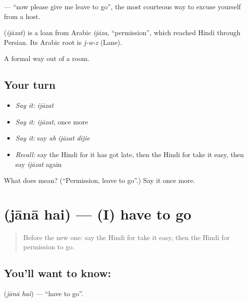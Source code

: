 \textbf{  } — \textquotedblleft{}now please give me leave to go\textquotedblright{}, the most courteous way to excuse yourself from a host.

\begin{cousinweb}
\textbf{} (\emph{ijāzat}) is a loan from Arabic \emph{ijāza}, \textquotedblleft{}permission\textquotedblright{}, which reached Hindi through Persian. Its Arabic root is \emph{j-w-z} (Lane).
\end{cousinweb}

\begin{grammarlens}[title={What you've built}]
A formal way out of a room.
\end{grammarlens}

\subsection*{Your turn}
\begin{itemize}
\raggedright
  \item \emph{Say it:} \emph{ijāzat}
  \item \emph{Say it:} \emph{ijāzat}, once more
  \item \emph{Say it:} say \emph{ab ijāzat dījie}
  \item \emph{Recall:} say the Hindi for it has got late, then the Hindi for take it easy, then say \emph{ijāzat} again
\end{itemize}

\begin{tcolorbox}[breakable,colback=teal!4,colframe=teal!35!black,title={Before you move on}]
What does  mean? (\textquotedblleft{}Permission, leave to go\textquotedblright{}.) Say it once more.
\end{tcolorbox}
\section[\texorpdfstring{\hi{जाना} \hi{है} (jānā hai)}{जाना है (jānā hai)}]{  (jānā hai) — (I) have to go}

\label{lesson:HI-C122-janahai}



\begin{quote}
Before the new one: say the Hindi for take it easy, then the Hindi for permission to go.
\end{quote}

\subsection*{You'll want to know:  }
\textbf{ } (\emph{jānā hai}) — \textquotedblleft{}have to go\textquotedblright{}.

